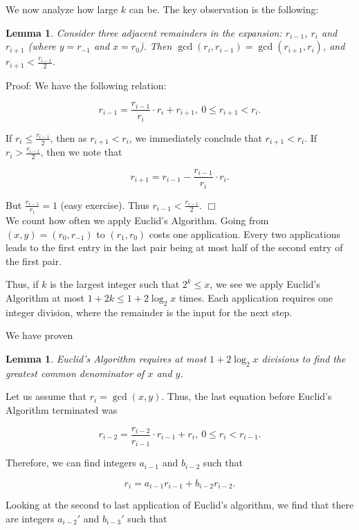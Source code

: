 \documentclass[12pt,letterpaper]{report}
\newcommand\be{\begin{equation}}
\newcommand\ee{\end{equation}}
\newtheorem{lem}[thm]{Lemma}
\begin{document}
We now analyze how large $k$ can be. The key observation is the
following:

\begin{lem}\label{lemnumstepseuclid}Consider three adjacent remainders
in the expansion: $r_{i-1}$, $r_i$ and $r_{i+1}$ (where $y =
r_{-1}$ and $x = r_0$). Then $\gcd(r_i,r_{i-1}) =
\gcd(r_{i+1},r_i)$, and $r_{i+1} < \frac{r_{i-1}}{2}$.
\end{lem}

Proof: We have the following relation:

\be r_{i-1} = \frac{r_{i-1}}{r_i} \cdot r_i + r_{i+1}, \ 0 \le
r_{i+1} < r_i. \ee

If $r_i \le \frac{r_{i-1}}{2}$, then as $r_{i+1} < r_i$, we
immediately conclude that $r_{i+1} < r_i$. If $r_i >
\frac{r_{i-1}}{2}$, then we note that

\be r_{i+1} = r_{i-1} - \frac{r_{i-1}}{r_i} \cdot r_i. \ee

But $\frac{r_{i-1}}{r_i} = 1$ (easy exercise). Thus $r_{i-1} <
\frac{r_{i-1}}{2}$. $\Box$ \\

We count how often we apply Euclid's Algorithm. Going from $(x,y)
= (r_0,r_{-1})$ to $(r_1,r_0)$ costs one application. Every two
applications leads to the first entry in the last pair being at
most half of the second entry of the first pair.

Thus, if $k$ is the largest integer such that $2^k \le x$, we see
we apply Euclid's Algorithm at most $1 + 2k \le 1 + 2\log_2 x$
times. Each application requires one integer division, where the
remainder is the input for the next step.

We have proven

\begin{lem} Euclid's Algorithm requires at most $1 + 2 \log_2 x$
divisions to find the greatest common denominator of $x$ and $y$.
\end{lem}

Let us assume that $r_i = \gcd(x,y)$. Thus, the last equation
before Euclid's Algorithm terminated was

\be r_{i-2} = \frac{ r_{i-2} }{r_{i-1}} \cdot r_{i-1} + r_i, \ 0
\le r_i < r_{i-1}. \ee

Therefore, we can find integers $a_{i-1}$ and $b_{i-2}$ such that

\be r_i = a_{i-1} r_{i-1} + b_{i-2} r_{i-2}. \ee

Looking at the second to last application of Euclid's algorithm,
we find that there are integers $a_{i-2}'$ and $b_{i-3}'$ such
that
\end{document}
